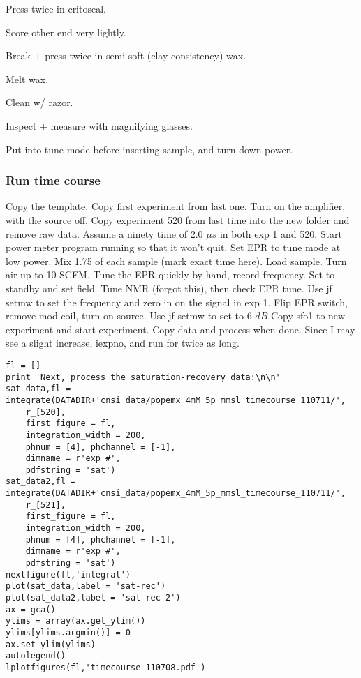 Press twice in critoseal.

Score other end very lightly.

Break + press twice in semi-soft (clay consistency) wax.

Melt wax.

Clean w/ razor.

Inspect + measure with magnifying glasses.

Put into tune mode before inserting sample, and turn down power.

\subsubsection{Run time course} Copy the template.   Copy first experiment from last one.   Turn on the amplifier, with the source off.  Copy experiment 520 from last time into the new folder and remove raw data.  Assume a ninety time of 2.0 $\mu s$ in both exp 1 and 520.  Start power meter program running so that it won't quit.  Set EPR to tune mode at low power.  Mix 1.75 of each sample (mark exact time here).  Load sample.  Turn air up to 10 SCFM.  Tune the EPR quickly by hand, record frequency.  Set to standby and set field.  Tune NMR (forgot this), then check EPR tune.  Use jf setmw to set the frequency and zero in on the signal in exp 1.  Flip EPR switch, remove mod coil, turn on source.  Use jf setmw to set to 6 $dB$ Copy sfo1 to new experiment and start experiment.  Copy data and process when done.   Since I may see a slight increase, iexpno, and run for twice as long.  
\begin{tiny}
\begin{lstlisting}
fl = []
print 'Next, process the saturation-recovery data:\n\n'
sat_data,fl = integrate(DATADIR+'cnsi_data/popemx_4mM_5p_mmsl_timecourse_110711/',
    r_[520],
    first_figure = fl,
    integration_width = 200,
    phnum = [4], phchannel = [-1],
    dimname = r'exp #',
    pdfstring = 'sat')
sat_data2,fl = integrate(DATADIR+'cnsi_data/popemx_4mM_5p_mmsl_timecourse_110711/',
    r_[521],
    first_figure = fl,
    integration_width = 200,
    phnum = [4], phchannel = [-1],
    dimname = r'exp #',
    pdfstring = 'sat')
nextfigure(fl,'integral')
plot(sat_data,label = 'sat-rec')
plot(sat_data2,label = 'sat-rec 2')
ax = gca()
ylims = array(ax.get_ylim())
ylims[ylims.argmin()] = 0
ax.set_ylim(ylims)
autolegend()
lplotfigures(fl,'timecourse_110708.pdf')
\end{lstlisting}
\end{tiny}

